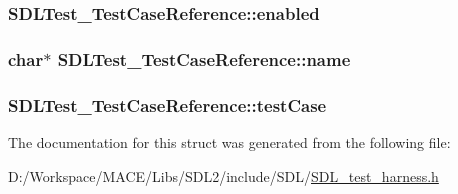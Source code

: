 \subsubsection[{\texorpdfstring{enabled}{enabled}}]{ S\+D\+L\+Test\+\_\+\+Test\+Case\+Reference\+::enabled}\hypertarget{struct_s_d_l_test___test_case_reference_a15168c85e38cae7557b4beb477ef6f9a}{}\label{struct_s_d_l_test___test_case_reference_a15168c85e38cae7557b4beb477ef6f9a}
\subsubsection[{\texorpdfstring{name}{name}}]{\setlength{\rightskip}{0pt plus 5cm}char$\ast$ S\+D\+L\+Test\+\_\+\+Test\+Case\+Reference\+::name}\hypertarget{struct_s_d_l_test___test_case_reference_aabd588c915c52fb13bcd0c71e071a604}{}\label{struct_s_d_l_test___test_case_reference_aabd588c915c52fb13bcd0c71e071a604}
\subsubsection[{\texorpdfstring{test\+Case}{testCase}}]{ S\+D\+L\+Test\+\_\+\+Test\+Case\+Reference\+::test\+Case}\hypertarget{struct_s_d_l_test___test_case_reference_af9472f0c421a2845b540fc28fb30a3ef}{}\label{struct_s_d_l_test___test_case_reference_af9472f0c421a2845b540fc28fb30a3ef}


The documentation for this struct was generated from the following file\+:\begin{DoxyCompactItemize}
\item 
D\+:/\+Workspace/\+M\+A\+C\+E/\+Libs/\+S\+D\+L2/include/\+S\+D\+L/\hyperlink{_s_d_l__test__harness_8h}{S\+D\+L\+\_\+test\+\_\+harness.\+h}\end{DoxyCompactItemize}
